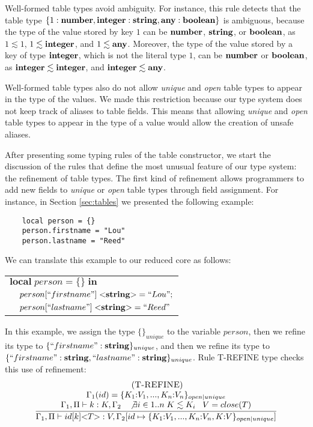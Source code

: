Well-formed table types avoid ambiguity.
For instance, this rule detects that the table type
$\{1:\mathbf{number}, \mathbf{integer}:\mathbf{string}, \mathbf{any}:\mathbf{boolean}\}$ is ambiguous,
because the type of the value stored by key $1$ can be
$\mathbf{number}$, $\mathbf{string}$, or $\mathbf{boolean}$, as $1 \lesssim 1$,
$1 \lesssim \mathbf{integer}$, and $1 \lesssim \mathbf{any}$.
Moreover, the type of the value stored by a key of type $\mathbf{integer}$,
which is not the literal type $1$, can be $\mathbf{number}$ or $\mathbf{boolean}$,
as $\mathbf{integer} \lesssim \mathbf{integer}$, and $\mathbf{integer} \lesssim \mathbf{any}$.

Well-formed table types also do not allow \emph{unique} and
\emph{open} table types to appear in the type of the values.
We made this restriction because our type system does not keep
track of aliases to table fields.
This means that allowing \emph{unique} and \emph{open} table
types to appear in the type of a value would allow the
creation of unsafe aliases.

After presenting some typing rules of the table constructor,
we start the discussion of the rules that define the most
unusual feature of our type system: the refinement of table types.
The first kind of refinement allows programmers to add new
fields to \emph{unique} or \emph{open} table types through
field assignment.
For instance, in Section \ref{sec:tables} we presented the
following example:
\begin{verbatim}
    local person = {}
    person.firstname = "Lou"
    person.lastname = "Reed"
\end{verbatim}

We can translate this example to our reduced core as follows:
\begin{center}
\begin{tabular}{ll}
\multicolumn{2}{l}{$\mathbf{local} \; person = \{\} \; \mathbf{in}$}\\
& \multicolumn{1}{l}{$person[``firstname"] \; {<}\mathbf{string}{>} = ``Lou";$}\\
& \multicolumn{1}{l}{$person[``lastname"] \; {<}\mathbf{string}{>} = ``Reed"$}
\end{tabular}
\end{center}

In this example, we assign the type $\{\}_{unique}$ to the variable
$person$, then we refine its type to $\{``firstname":\mathbf{string}\}_{unique}$,
and then we refine its type to $\{``firstname":\mathbf{string}, ``lastname":\mathbf{string}\}_{unique}$.
Rule \textsc{T-REFINE} type checks this use of refinement:
\[
\begin{array}{c}
\; (\textsc{T-REFINE})\\
\dfrac{\begin{array}{c}
       \Gamma_{1}(id) = \{ K_{1}{:}V_{1}, ..., K_{n}{:}V_{n} \}_{open|unique}\\
       \Gamma_{1}, \Pi \vdash k:K, \Gamma_{2} \;\;\;
       \not \exists i \in 1..n \; K \lesssim K_{i} \;\;\;
       V = close(T)
       \end{array}}
      {\Gamma_{1}, \Pi \vdash id[k] {<}T{>}:V, \Gamma_{2}[id \mapsto \{ K_{1}{:}V_{1}, ..., K_{n}{:}V_{n}, K{:}V\}_{open|unique}]}
\end{array}
\]

